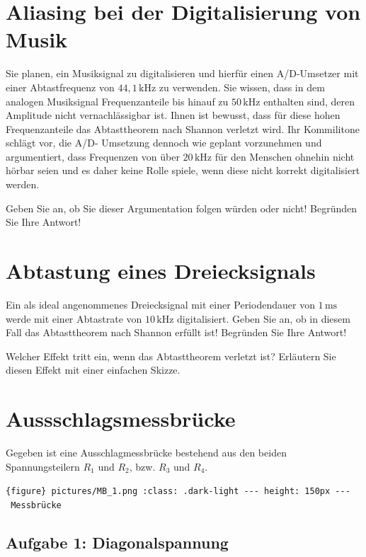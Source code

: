 \documentclass[
]{book}
\begin{document}
\section{Aliasing bei der Digitalisierung von Musik}\label{aliasing-bei-der-digitalisierung-von-musik-1}

Sie planen, ein Musiksignal zu digitalisieren und hierfür einen A/D-Umsetzer mit einer Abtastfrequenz von \(44,1\,\mathrm{kHz}\) zu verwenden. Sie wissen, dass in dem analogen Musiksignal Frequenzanteile bis hinauf zu \(50\,\mathrm{kHz}\) enthalten sind, deren Amplitude nicht vernachlässigbar ist. Ihnen ist bewusst, dass für diese hohen Frequenzanteile das Abtasttheorem nach Shannon verletzt wird. Ihr Kommilitone schlägt vor, die A/D- Umsetzung dennoch wie geplant vorzunehmen und argumentiert, dass Frequenzen von über \(20\,\mathrm{kHz}\) für den Menschen ohnehin nicht hörbar seien und es daher keine Rolle spiele, wenn diese nicht korrekt digitalisiert werden.

Geben Sie an, ob Sie dieser Argumentation folgen würden oder nicht! Begründen Sie Ihre Antwort!

\section{Abtastung eines Dreiecksignals}\label{abtastung-eines-dreiecksignals-1}

Ein als ideal angenommenes Dreiecksignal mit einer Periodendauer von \(1\,\mathrm{ms}\) werde mit einer Abtastrate von \(10\,\mathrm{kHz}\) digitalisiert. Geben Sie an, ob in diesem Fall das Abtasttheorem nach Shannon erfüllt ist! Begründen Sie Ihre Antwort!

Welcher Effekt tritt ein, wenn das Abtasttheorem verletzt ist? Erläutern Sie diesen Effekt mit einer einfachen Skizze.

\section{Aussschlagsmessbrücke}\label{aussschlagsmessbruxfccke}

Gegeben ist eine Ausschlagmessbrücke bestehend aus den beiden Spannungsteilern \(R_1\) und \(R_2\), bzw. \(R_3\) und \(R_4\).

\texttt{\{figure\}\ pictures/MB\_1.png\ :class:\ .dark-light\ -\/-\/-\ height:\ 150px\ -\/-\/-\ Messbrücke}

\subsection{Aufgabe 1: Diagonalspannung}\label{aufgabe-1-diagonalspannung}
\end{document}
